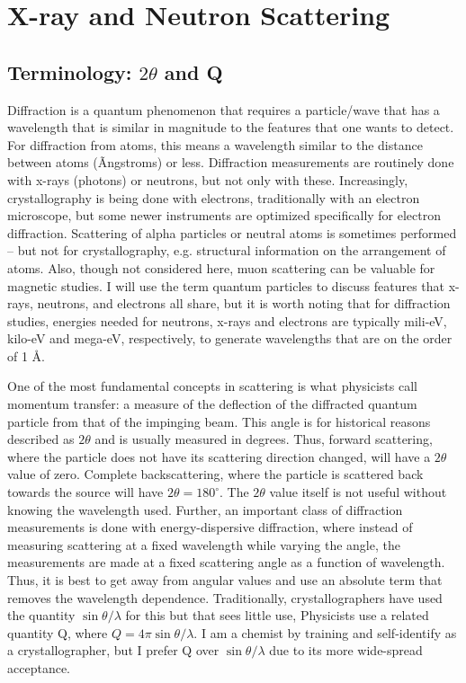 \chapter{X-ray and Neutron Scattering}
\label{Chap:diffraction}

\section{Terminology: \texorpdfstring{$2\theta$}{2theta} and Q}

Diffraction is a quantum phenomenon that requires a particle/wave that has a wavelength that is similar in magnitude to the features that one wants to detect. For diffraction from atoms, this means a wavelength similar to the distance between atoms (Ãngstroms) or less. Diffraction measurements are routinely done with x-rays (photons) or neutrons, but not only with these. Increasingly, crystallography is being done with electrons, traditionally with an electron microscope, but some newer instruments are optimized specifically for electron diffraction. Scattering of alpha particles or neutral atoms is sometimes performed – but not for crystallography, e.g. structural information on the arrangement of atoms. Also, though not considered here, muon scattering can be valuable for magnetic studies. I will use the term quantum particles to discuss features that x-rays, neutrons, and electrons all share, but it is worth noting that for diffraction studies, energies needed for neutrons, x-rays and electrons are typically mili-eV, kilo-eV and mega-eV, respectively, to generate wavelengths that are on the order of 1 Å.

One of the most fundamental concepts in scattering is what physicists call momentum transfer: a measure of the deflection of the diffracted quantum particle from that of the impinging beam. This angle is for historical reasons described as $2\theta$ and is usually measured in degrees. 
 Thus, forward scattering, where the particle does not have its scattering direction changed, will have a $2\theta$ value of zero. Complete backscattering, where the particle is scattered back towards the source will have $2\theta=180^\circ$. 
 The $2\theta$ value itself is not useful without knowing the wavelength used. Further, an important class of diffraction measurements is done with energy-dispersive diffraction, where instead of measuring scattering at a fixed wavelength while varying the angle, the measurements are made at a fixed scattering angle as a function of wavelength. Thus, it is best to get away from angular values and use an absolute term that removes the wavelength dependence. Traditionally, crystallographers have used the quantity $\sin\theta/\lambda$ for this but that sees little use, Physicists use a related quantity Q, where $Q =  4 \pi \sin\theta/\lambda$. I am a chemist by training and self-identify as a crystallographer, but I prefer Q over $\sin\theta/\lambda$ due to its more wide-spread acceptance. 


